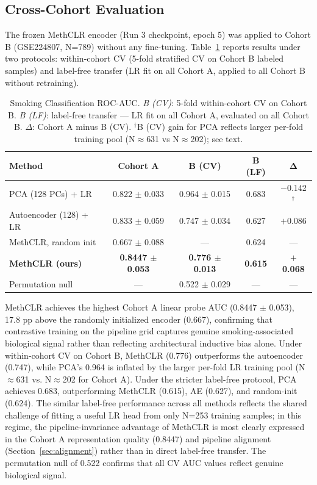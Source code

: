 \documentclass[conference]{IEEEtran}
\begin{document}
\subsection{Cross-Cohort Evaluation}

The frozen MethCLR encoder (Run 3 checkpoint, epoch 5) was applied to Cohort B (GSE224807, N=789) without any fine-tuning. Table~\ref{tab:crosscohort} reports results under two protocols: within-cohort CV (5-fold stratified CV on Cohort B labeled samples) and label-free transfer (LR fit on all Cohort A, applied to all Cohort B without retraining).

\begin{table}[htbp]
\caption{Smoking Classification ROC-AUC. \textit{B (CV)}: 5-fold within-cohort CV on Cohort B. \textit{B (LF)}: label-free transfer — LR fit on all Cohort A, evaluated on all Cohort B. $\Delta$: Cohort A minus B (CV). $^{\dagger}$B (CV) gain for PCA reflects larger per-fold training pool (N$\approx$631 vs N$\approx$202); see text.}
\begin{center}
\footnotesize
\begin{tabular}{lcccc}
\toprule
\textbf{Method} & \textbf{Cohort A} & \textbf{B (CV)} & \textbf{B (LF)} & $\boldsymbol{\Delta}$ \\
\midrule
PCA (128 PCs) + LR      & 0.822 $\pm$ 0.033 & 0.964 $\pm$ 0.015 & 0.683 & $-$0.142$^{\dagger}$ \\
Autoencoder (128) + LR  & 0.833 $\pm$ 0.059 & 0.747 $\pm$ 0.034 & 0.627 & $+$0.086 \\
MethCLR, random init    & 0.667 $\pm$ 0.088 & —                 & 0.624 & — \\
\textbf{MethCLR (ours)} & \textbf{0.8447 $\pm$ 0.053} & \textbf{0.776 $\pm$ 0.013} & \textbf{0.615} & \textbf{$+$0.068} \\
\midrule
Permutation null        & —                 & 0.522 $\pm$ 0.029 & —     & — \\
\bottomrule
\end{tabular}
\label{tab:crosscohort}
\end{center}
\end{table}

MethCLR achieves the highest Cohort A linear probe AUC (0.8447 $\pm$ 0.053), 17.8 pp above the randomly initialized encoder (0.667), confirming that contrastive training on the pipeline grid captures genuine smoking-associated biological signal rather than reflecting architectural inductive bias alone. Under within-cohort CV on Cohort B, MethCLR (0.776) outperforms the autoencoder (0.747), while PCA's 0.964 is inflated by the larger per-fold LR training pool (N$\approx$631 vs. N$\approx$202 for Cohort A). Under the stricter label-free protocol, PCA achieves 0.683, outperforming MethCLR (0.615), AE (0.627), and random-init (0.624). The similar label-free performance across all methods reflects the shared challenge of fitting a useful LR head from only N=253 training samples; in this regime, the pipeline-invariance advantage of MethCLR is most clearly expressed in the Cohort A representation quality (0.8447) and pipeline alignment (Section~\ref{sec:alignment}) rather than in direct label-free transfer. The permutation null of 0.522 confirms that all CV AUC values reflect genuine biological signal.
\end{document}
